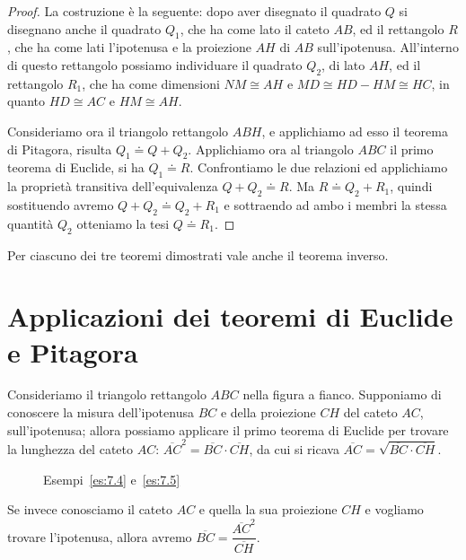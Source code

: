 \noindent\begin{minipage}{0.6\textwidth}\parindent15pt
\begin{proof}

La costruzione è la seguente: dopo aver disegnato il quadrato \(Q\) si 
disegnano anche il quadrato \(Q_1\), che ha come lato il cateto \(AB\), 
ed il rettangolo \(R\), che ha come lati l'ipotenusa e la proiezione 
\(AH\) di \(AB\) sull'ipotenusa. All'interno di questo rettangolo 
possiamo individuare il quadrato \(Q_2\), di lato \(AH\), ed il rettangolo 
\(R_1\), che ha come dimensioni \(NM\cong AH\) e \(MD\cong HD-HM\cong HC\), 
in quanto \(HD\cong AC\) e \(HM\cong AH\).

Consideriamo ora il triangolo rettangolo \(ABH\), e applichiamo ad esso 
il teorema di Pitagora, risulta \(Q_1\doteq Q+Q_2\). Applichiamo ora al 
triangolo \(ABC\) il primo teorema di Euclide, si ha \(Q_1\doteq R\). 
Confrontiamo le due relazioni ed applichiamo la proprietà transitiva 
dell'equivalenza \(Q+Q_2\doteq R\). Ma \(R\doteq Q_2 + R_1\), quindi 
sostituendo avremo \(Q+Q_2\doteq Q_2 + R_1\) e sottraendo ad ambo i 
membri la stessa quantità \(Q_2\) otteniamo la tesi \(Q\doteq R_1\).
\end{proof}
\end{minipage}\hfil
\begin{minipage}{0.4\textwidth}
  \centering
\end{minipage}\vspace{8pt}

Per ciascuno dei tre teoremi dimostrati vale anche il teorema inverso.


\section{Applicazioni dei teoremi di Euclide e Pitagora}
\label{sect:applicazioni_pitagora_euclide}

Consideriamo il triangolo rettangolo \(ABC\) nella figura a fianco.
Supponiamo di conoscere la misura dell'ipotenusa \(BC\) e della 
proiezione \(CH\) del cateto \(AC\), sull'ipotenusa; allora possiamo 
applicare il primo teorema di Euclide per trovare la lunghezza del 
cateto \(AC\): \(\overline{AC}^2=\overline{BC}\cdot \overline{CH}\), da 
cui si ricava \(\overline{AC}=\sqrt{\overline{BC}\cdot \overline{CH}}\).

\begin{wrapfigure}{r}{0.25\textwidth}
  \centering
  \caption{Esempi~\ref{es:7.4} e~\ref{es:7.5}}\label{fig:es7.4}
\end{wrapfigure}
Se invece conosciamo il cateto \(AC\) e quella la sua 
proiezione \(CH\) e vogliamo trovare l'ipotenusa, allora avremo 
\(\overline{BC}=\dfrac{\overline{AC}^2}{\overline{CH}}\).

